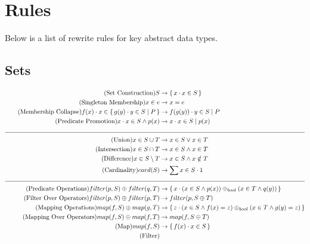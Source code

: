 \documentclass{article}
\newcommand{\bSet}[3]{%
  \{\, #1 \cdot #2 \mid #3 \, \}%
}
\newcommand{\bSetT}[2]{%
  \{\, #1 \cdot #2 \,\}%
}
\begin{document}
\section{Rules}
Below is a list of rewrite rules for key abstract data types.
\subsection{Sets}

\begin{align}
  \tag{Set Construction}
  S &\rightarrow \bSetT{x}{x \in S}
  \\
  \tag{Singleton Membership}
  x \in {e} &\rightarrow x = e
  \\
  \tag{Membership Collapse}
  f(x) \cdot x \in \bSet{g(y)}{y \in S}{P} &\rightarrow f(g(y)) \cdot y \in S \mid P
  \\
  \tag{Predicate Promotion}
  x \cdot x \in S \land p(x) &\rightarrow x \cdot x \in S \mid p(x)
  \\
  \cline{1-2}
  \tag{Union}
  x \in S \cup T &\rightarrow x \in S \lor x \in T
  \\
  \tag{Intersection}
  x \in S \cap T &\rightarrow x \in S \land x \in T
  \\
  \tag{Difference}
  x \in S \setminus T &\rightarrow x \in S \land x \notin T
  \\
  \tag{Cardinality}
  card(S) &\rightarrow \sum x \in S \cdot 1
  \\
  \cline{1-2}
  \tag{Predicate Operations}
  filter(p, S) \oplus filter(q, T) &\rightarrow \bSetT{x}{(x \in S \land p(x)) \oplus_{bool} (x \in T \land q(y))}
  \\
  \tag{Filter Over Operators}
  filter(p, S) \oplus filter(p, T) &\rightarrow filter(p, S \oplus T)
  \\
  \tag{Mapping Operations}
  map(f, S) \oplus map(g, T) &\rightarrow \bSetT{z}{(x \in S \land f(x) = z) \oplus_{bool} (x \in T \land g(y) = z)}
  \\
  \tag{Mapping Over Operators}
  map(f, S) \oplus map(f, T) &\rightarrow map(f, S \oplus T)
  \\
  \tag{Map}
  map(f, S)  &\rightarrow \bSetT{f(x)}{x \in S}
  \\
  \tag{Filter}

\end{align}
\end{document}
